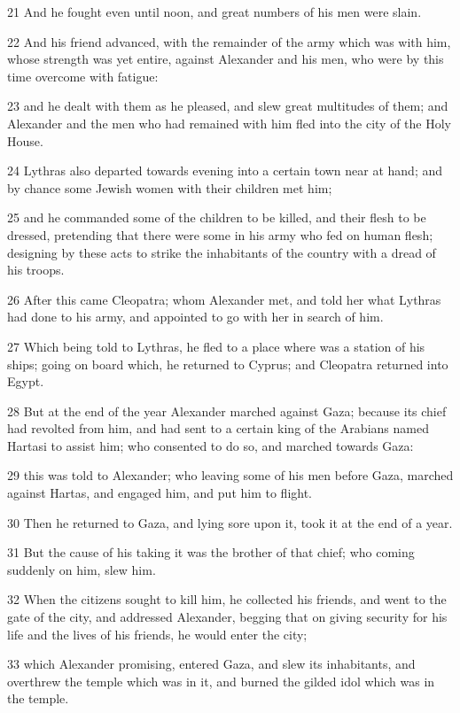 21 And he fought even until noon, and great numbers of his men were slain. 

22 And his friend advanced, with the remainder of the army which was with him, whose strength was yet entire, against Alexander and his men, who were by this time overcome with fatigue: 

23 and he dealt with them as he pleased, and slew great multitudes of them; and Alexander and the men who had remained with him fled into the city of the Holy House. 

24 Lythras also departed towards evening into a certain town near at hand; and by chance some Jewish women with their children met him;

25 and he commanded some of the children to be killed, and their flesh to be dressed, pretending that there were some in his army who fed on human flesh; designing by these acts to strike the inhabitants of the country with a dread of his troops. 

26 After this came Cleopatra; whom Alexander met, and told her what Lythras had done to his army, and appointed to go with her in search of him. 

27 Which being told to Lythras, he fled to a place where was a station of his ships; going on board which, he returned to Cyprus; and Cleopatra returned into Egypt.

28 But at the end of the year Alexander marched against Gaza; because its chief had revolted from him, and had sent to a certain king of the Arabians named Hartasi to assist him; who consented to do so, and marched towards Gaza: 

29 this was told to Alexander; who leaving some of his men before Gaza, marched against Hartas, and engaged him, and put him to flight. 

30 Then he returned to Gaza, and lying sore upon it, took it at the end of a year. 

31 But the cause of his taking it was the brother of that chief; who coming suddenly on him, slew him. 

32 When the citizens sought to kill him, he collected his friends, and went to the gate of the city, and addressed Alexander, begging that on giving security for his life and the lives of his friends, he would enter the city; 

33 which Alexander promising, entered Gaza, and slew its inhabitants, and overthrew the temple which was in it, and burned the gilded idol which was in the temple. 

